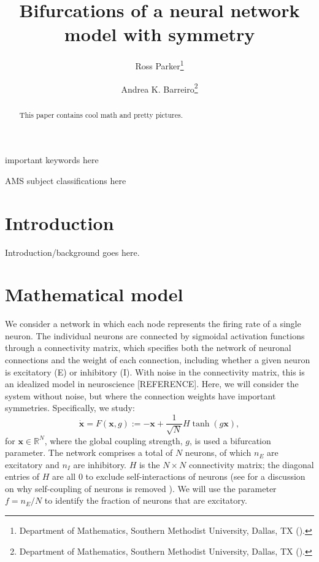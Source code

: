 \documentclass[reqno]{siamonline190516}
\title{Bifurcations of a neural network model with symmetry}
\author{Ross Parker\thanks{Department of Mathematics, Southern Methodist University, Dallas, TX (\email{rhparker@smu.edu}).}
\and Andrea K. Barreiro\thanks{Department of Mathematics, Southern Methodist University, Dallas, TX (\email{abarreiro@smu.edu}).}
}
\newcommand{\xvec}{\mathbf{x}}
\newcommand{\R}{\mathbb{R}}
\begin{document}

\maketitle

\begin{abstract}
  This paper contains cool math and pretty pictures.
\end{abstract}

\begin{keywords}
  important keywords here
\end{keywords}

\begin{AMS}
  AMS subject classifications here
\end{AMS}

\section{Introduction}

Introduction/background goes here.

\section{Mathematical model}\label{sec:model}

We consider a network in which each node represents the firing rate of a single neuron. The individual neurons are connected by sigmoidal activation functions through a connectivity matrix, which specifies both the network of neuronal connections and the weight of each connection, including whether a given neuron is excitatory (E) or inhibitory (I). With noise in the connectivity matrix, this is an idealized model in neuroscience [REFERENCE]. Here, we will consider the system without noise, but where the connection weights have important symmetries. Specifically, we study:
\begin{equation}\label{eqn:sys_Basic}
    \dot{\xvec} = 
    F(\xvec, g) := -\xvec  + \frac{1}{\sqrt{N}} H\tanh (g \xvec),
\end{equation}
for $\xvec \in \R^N$, where the global coupling strength, $g$, is used a bifurcation parameter. The network comprises a total of $N$ neurons, of which $n_E$ are excitatory and $n_I$ are inhibitory. $H$ is the $N \times N$ connectivity matrix; the diagonal entries of $H$ are all 0 to exclude self-interactions of neurons (see \cite[Sec. 2.1]{Barreiro2017} for a discussion on why self-coupling of neurons is removed ). We will use the parameter $f = n_E / N$ to identify the fraction of neurons that are excitatory.
\end{document}
